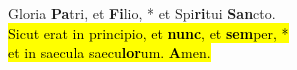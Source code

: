 Gloria \textbf{Pa}tri, et \textbf{Fi}lio, * et Spi\textbf{ri}tui \textbf{San}cto. \\
\hl{Sicut erat in principio, et \textbf{nunc}, et \textbf{sem}per, *\\
et in saecula saecu\textbf{lor}um. \textbf{A}men.}
